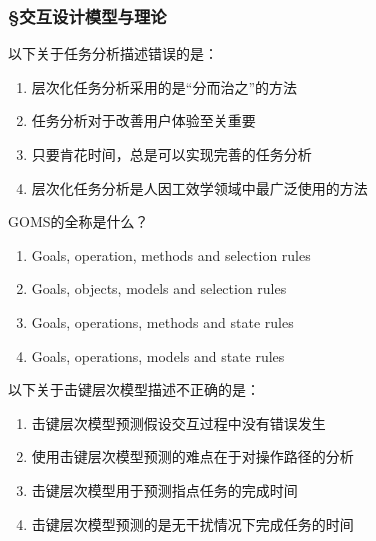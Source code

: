 \subsubsection*{\S 交互设计模型与理论}
\setcounter{problemname}{0}

\begin{problem}
	‍‌以下关于任务分析描述错误的是：
        \begin{enumerate}[label=\Alph*.]
            \item 层次化任务分析采用的是“分而治之”的方法
            \item 任务分析对于改善用户体验至关重要
            \item 只要肯花时间，总是可以实现完善的任务分析
            \item 层次化任务分析是人因工效学领域中最广泛使用的方法
        \end{enumerate}
\end{problem}



\begin{problem}
	GOMS的全称是什么？
    \vspace{-0.8em}
    \begin{multicols}{2}
        \begin{enumerate}[label=\Alph*.]
            \item Goals, operation, methods and selection rules
            \item Goals, objects, models and selection rules
            \item Goals, operations, methods and state rules
            \item Goals, operations, models and state rules
        \end{enumerate}
    \end{multicols}
    \vspace{-1em}
\end{problem}



\begin{problem}
	以下关于击键层次模型描述不正确的是：
        \begin{enumerate}[label=\Alph*.]
            \item 击键层次模型预测假设交互过程中没有错误发生
            \item 使用击键层次模型预测的难点在于对操作路径的分析
            \item 击键层次模型用于预测指点任务的完成时间
            \item 击键层次模型预测的是无干扰情况下完成任务的时间
        \end{enumerate}
\end{problem}



